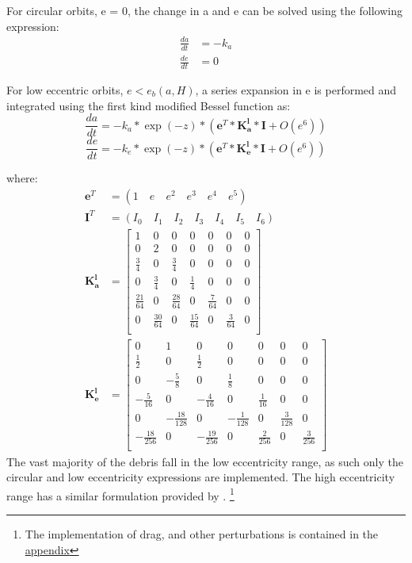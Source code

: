 \documentclass[a4paper, 12pt]{article}
\begin{document}
For circular orbits, e = 0, the change in a and e can be solved using the following expression:
\begin{equation*}
	\begin{aligned}
		\frac{da}{dt} &= -k_a\\
		\frac{de}{dt} &= 0
	\end{aligned}
\end{equation*}

For low eccentric orbits, $e < e_b(a, H)$, a series expansion in e is performed and integrated using the first kind modified Bessel function as:
\begin{equation}
		\frac{da}{dt}  = -k_a * \exp(-z) * (\boldsymbol{e}^T * \boldsymbol{K_a^l} * \boldsymbol{I} + O(e^6))
\end{equation}
\begin{equation}
	\frac{de}{dt}  = -k_e* \exp(-z) * (\boldsymbol{e}^T * \boldsymbol{K_e^l} * \boldsymbol{I} + O(e^6))
\end{equation}

where:\begin{align}
	 \boldsymbol{e}^T &=(1\quad  e\quad e^2\quad e^3\quad e^4\quad e^5)\\
	\boldsymbol{I}^T &=(I_0\quad  I_1\quad I_2\quad I_3\quad I_4\quad I_5\quad I_6)\\
	\boldsymbol{K_a^l} &= \begin{bmatrix}
		1 & 0 & 0 & 0 &0&0 &0\\
		0 & 2 & 0 & 0 &0&0 &0\\
		\frac{3}{4} & 0 & \frac{3}{4} & 0 &0&0 &0\\
		0 & \frac{3}{4} & 0 & \frac{1}{4} &0&0 &0\\
	    \frac{21}{64} & 0 & \frac{28}{64} & 0 &\frac{7}{64}&0 &0\\
	    0 & \frac{30}{64} & 0 & \frac{15}{64} &0&\frac{3}{64} &0\\
	\end{bmatrix}\\
	\boldsymbol{K_e^l} &= \begin{bmatrix}
		0 & 1 & 0 & 0 &0&0 &0\\
		\frac{1}{2} & 0 & \frac{1}{2} & 0 &0&0 &0\\
		0 & -\frac{5}{8}  & 0 & \frac{1}{8}  &0&0 &0\\
		-\frac{5}{16}  & 0 & -\frac{4}{16}  &0 &\frac{1}{16} &0 &0\\
		0 & -\frac{18}{128} & 0& -\frac{1}{128}  &0&\frac{3}{128}  &0\\
		-\frac{18}{256}  & 0 & -\frac{19}{256}  & 0 &\frac{2}{256} &0 &\frac{3}{256} \\
	\end{bmatrix}
\end{align}
The vast majority of the debris fall in the low eccentricity range, as such only the circular and low eccentricity expressions are implemented. The high eccentricity range has a similar formulation provided by \cite{frey_extension_2019}. \footnote{The implementation of drag, and other perturbations is contained in the \hyperref[subsec:propagation]{appendix}}
\end{document}

